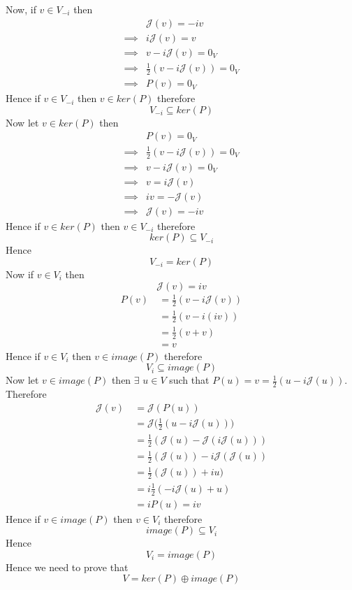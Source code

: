 \documentclass{article}
\newcommand{\mJ}{\mathcal{J}}
\begin{document}
\begin{enumerate}
	      \hspace*{1cm}Now, if $v\in V_{-i}$ then \begin{align*}
		               & \mJ(v)=-iv                 \\
		      \implies & i\mJ(v)=v                  \\
		      \implies & v-i\mJ(v)=0_V              \\
		      \implies & \frac{1}{2}(v-i\mJ(v))=0_V \\
		      \implies & P(v)=0_V
	      \end{align*}Hence if $v\in V_{-i}$ then $v\in ker(P)$ therefore $$V_{-i}\subseteq ker(P)$$Now let $v\in ker(P)$ then \begin{align*}
		               & P(v)=0_V                   \\
		      \implies & \frac{1}{2}(v-i\mJ(v))=0_V \\
		      \implies & v-i\mJ(v)=0_V              \\
		      \implies & v=i\mJ(v)                  \\
		      \implies & iv=-\mJ(v)                 \\
		      \implies & \mJ(v) =-iv
	      \end{align*}Hence if $v\in ker(P)$ then $v\in V_{-i}$ therefore $$ker(P)\subseteq V_{-i}$$Hence$$V_{-i}=ker(P)$$
	      \hspace*{1cm}Now if $v\in V_{i}$ then$$\mJ(v)=iv$$\begin{align*}
		      P(v)\  & =\frac{1}{2}(v-i\mJ(v)) \\
		             & =\frac{1}{2}(v-i(iv))   \\
		             & =\frac{1}{2}(v+v)       \\
		             & =v
	      \end{align*}Hence if $v\in V_{i}$ then $v\in image(P)$ therefore $$V_{i}\subseteq image(P)$$Now let $v\in image(P)$ then $\exists$ $u\in V$ such that $P(u)=v=\frac{1}{2}(u-i\mJ(u))$. Therefore\begin{align*}
		      \mJ(v)\  & =\mJ(P(u))                             \\
		               & =\mJ\bigg(\frac{1}{2}(u-i\mJ(u))\bigg) \\
		               & =\frac{1}{2}(\mJ(u)-\mJ(i\mJ(u)))      \\
		               & =\frac{1}{2}(\mJ(u))-i\mJ(\mJ(u))      \\
		               & =\frac{1}{2}(\mJ(u))+iu)               \\
		               & =i\frac{1}{2}(-i\mJ(u)+u)              \\
		               & =iP(u)=iv
	      \end{align*}Hence if $v\in image(P)$ then $v\in V_{i}$ therefore $$image(P)\subseteq V_{i}$$Hence$$V_{i}=image(P)$$Hence we need to prove that $$V=ker(P)\oplus image(P)$$


\end{enumerate}
\end{document}
